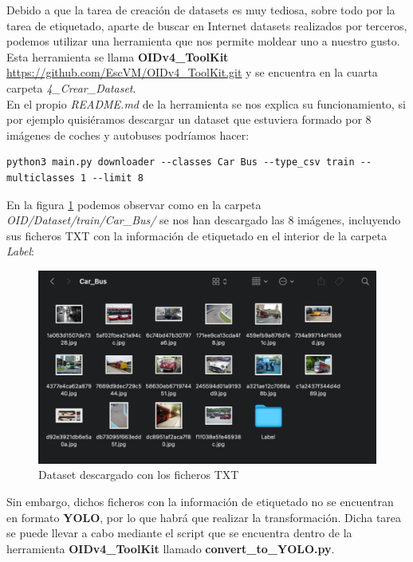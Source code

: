 Debido a que la tarea de creación de datasets es muy tediosa, sobre todo por la tarea de etiquetado, aparte de buscar en Internet datasets realizados por terceros, podemos utilizar una herramienta que nos permite moldear uno a nuestro gusto. Esta herramienta se llama \textbf{OIDv4_ToolKit} \url{https://github.com/EscVM/OIDv4_ToolKit.git} y se encuentra en la cuarta carpeta \textit{4_Crear_Dataset}.\\

En el propio \textit{README.md} de la herramienta se nos explica su funcionamiento, si por ejemplo quisiéramos descargar un dataset que estuviera formado por 8 imágenes de coches y autobuses podríamos hacer:

\begin{lstlisting}
python3 main.py downloader --classes Car Bus --type_csv train --multiclasses 1 --limit 8
\end{lstlisting}

En la figura \ref{dataset} podemos observar como en la carpeta \textit{OID/Dataset/train/Car_Bus/} se nos han descargado las 8 imágenes, incluyendo sus ficheros TXT con la información de etiquetado en el interior de la carpeta \textit{Label}:

\begin{figure}[H]
	\centering
	\includegraphics[width=\textwidth]{Imagenes/AnexoI_Manual/AA/dataset.pdf}
	\caption{Dataset descargado con los ficheros TXT}
	\label{dataset}
\end{figure}

Sin embargo, dichos ficheros con la información de etiquetado no se encuentran en formato \textbf{YOLO}, por lo que habrá que realizar la transformación. Dicha tarea se puede llevar a cabo mediante el script que se encuentra dentro de la herramienta \textbf{OIDv4_ToolKit} llamado \textbf{convert_to_YOLO.py}. \\

